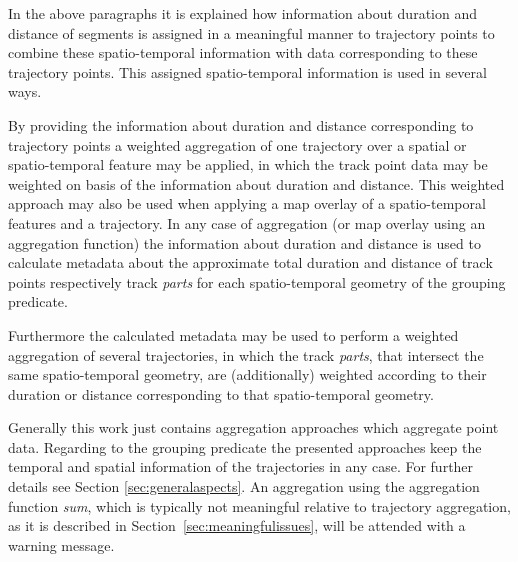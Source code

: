 \documentclass[12pt, oneside, a4paper]{scrbook}
\begin{document}
In the above paragraphs it is explained how information about duration and distance of segments is assigned in a meaningful manner to trajectory points to combine these spatio-temporal information with data corresponding to these trajectory points. This assigned spatio-temporal information is used in several ways.
\par\medskip

By providing the information about duration and distance corresponding to trajectory points a weighted aggregation of one trajectory over a spatial or spatio-temporal feature may be applied, in which the track point data may be weighted on basis of the information about duration and distance. This weighted approach may also be used when applying a map overlay of a spatio-temporal features and a trajectory. In any case of aggregation (or map overlay using an aggregation function) the information about duration and distance is used to calculate metadata about the approximate total duration and distance of track points respectively track \textit{parts} for each spatio-temporal geometry of the grouping predicate.
\par\medskip

Furthermore the calculated metadata may be used to perform a weighted aggregation of several trajectories, in which the track \textit {parts}, that intersect the same spatio-temporal geometry, are (additionally) weighted according to their duration or distance corresponding to that spatio-temporal geometry.
\par\medskip

Generally this work just contains aggregation approaches which aggregate point data. Regarding to the grouping predicate the presented approaches keep the temporal and spatial information of the trajectories in any case. For further details see Section \ref{sec:generalaspects}.
An aggregation using the aggregation function \textit{sum}, which is typically not meaningful relative to trajectory aggregation, as it is described in Section~\ref{sec:meaningfulissues}, will be attended with a warning message.





\end{document}
